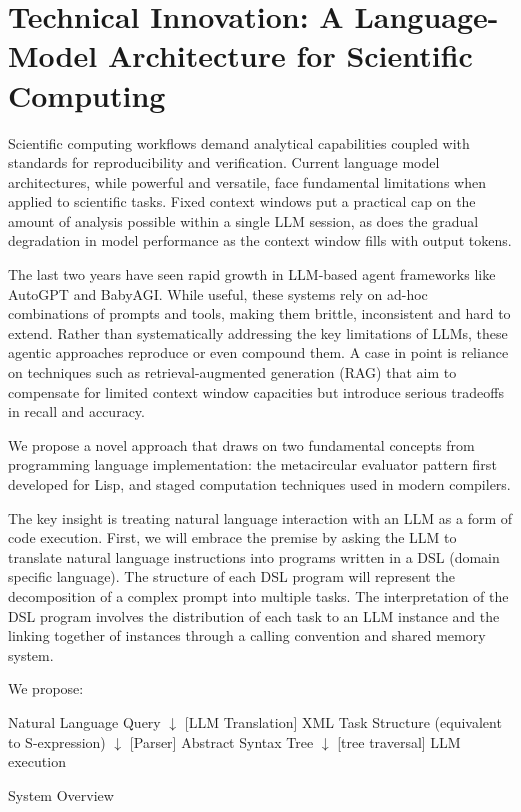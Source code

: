 \documentclass{article}
\begin{document}
\section{Technical Innovation: A Language-Model Architecture for Scientific Computing}
Scientific computing workflows demand analytical capabilities coupled with standards for reproducibility and verification. Current language model architectures, while powerful and versatile, face fundamental limitations when applied to scientific tasks. Fixed context windows put a practical cap on the amount of analysis possible within a single LLM session, as does the gradual degradation in model performance as the context window fills with output tokens.

The last two years have seen rapid growth in LLM-based agent frameworks like AutoGPT and BabyAGI. While useful, these systems rely on ad-hoc combinations of prompts and tools, making them brittle, inconsistent and hard to extend. Rather than systematically addressing the key limitations of LLMs, these agentic approaches reproduce or even compound them. A case in point is reliance on techniques such as retrieval-augmented generation (RAG) that aim to compensate for limited context window capacities but introduce serious tradeoffs in recall and accuracy.

We propose a novel approach that draws on two fundamental concepts from programming language implementation: the metacircular evaluator pattern first developed for Lisp, and staged computation techniques used in modern compilers.

The key insight is treating natural language interaction with an LLM as a form of code execution. First, we will embrace the premise by asking the LLM to translate natural language instructions into programs written in a DSL (domain specific language). The structure of each DSL program will represent the decomposition of a complex prompt into multiple tasks. The interpretation of the DSL program involves the distribution of each task to an LLM instance and the linking together of instances through a calling convention and shared memory system.

We propose:

\begin{algorithm}[H]
\SetAlgoLined
{}
Natural Language Query\;
$\downarrow$ [LLM Translation]\;
XML Task Structure (equivalent to S-expression)\;
$\downarrow$ [Parser]\;
Abstract Syntax Tree\;
$\downarrow$ [tree traversal]\;
LLM execution\;
\caption{System Overview}
\end{algorithm}
\end{document}
